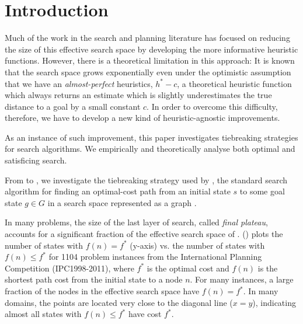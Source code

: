 
\section{Introduction}
\label{sec:introduction}

Much of the work in the search and planning literature has focused on
reducing the size of this effective search space by developing the more
informative heuristic functions. However, there is a theoretical
limitation in this approach: It is known that the search space grows
exponentially \cite{helmert2008good} even under the optimistic
assumption that we have an \emph{almost-perfect} heuristics, $h^*-c$, a
theoretical heuristic function which always returns an estimate which is
slightly underestimates the true distance to a goal by a small constant
$c$. In order to overcome this difficulty, therefore, we have to develop
a new kind of heuristic-agnostic improvements.

As an instance of such improvement, this paper investigates tiebreaking
strategies for search algorithms. We empirically and theoretically
analyse both optimal and satisficing search.


From  to , we investigate
the tiebreaking strategy used by \astar, the standard search algorithm
for finding an optimal-cost path from an initial state $s$ to some goal
state $g \in G$ in a search space represented as a graph
\cite{hart1968formal}. 

In many problems, the size of the last layer of search, called
\emph{final plateau}, accounts for a significant fraction of the
effective search space of \astar.  
() plots the number of states with $f(n) = f^*$
(y-axis) vs. the number of states with $f(n) \leq f^*$ for 1104 problem
instances from the International Planning Competition (IPC1998-2011),
where $f^*$ is the optimal cost and $f(n)$ is the shortest path cost
from the initial state to a node $n$.  For many instances, a large
fraction of the nodes in the effective search space have $f(n)=f^*$.
In many domains, the points are located very close to the diagonal line
($x=y$), indicating almost all states with $f(n) \leq f^*$ have cost
$f^*$.



